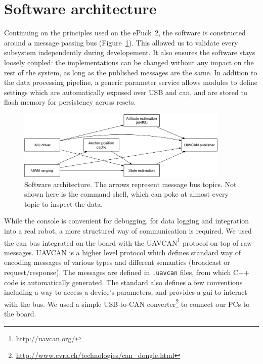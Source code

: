 \documentclass[a4paper, 12pt]{scrreprt}
\begin{document}
\section{Software architecture}

Continuing on the principles used on the ePuck~2, the software is constructed around a message passing bus (Figure~\ref{fig:architecture}).
This allowed us to validate every subsystem independently during developement.
It also ensures the software stays loosely coupled: the implementations can be changed without any impact on the rest of the system, as long as the published messages are the same.
In addition to the data processing pipeline, a generic parameter service allows modules to define settings which are automatically exposed over USB and \gls{can}, and are stored to flash memory for persistency across resets.

\begin{figure}[h]
    \centering
    \includegraphics[width=0.9\textwidth]{figures/architecture.pdf}
    \caption{Software architecture.
    The arrows represent message bus topics.
    Not shown here is the command shell, which can poke at almost every topic to inspect the data.
    }
    \label{fig:architecture}
\end{figure}

While the console is convenient for debugging, for data logging and integration into a real robot, a more structured way of communication is required.
We used the \gls{can} bus integrated on the board with the UAVCAN\footnote{\url{http://uavcan.org/}} protocol on top of raw messages.
UAVCAN is a higher level protocol which defines standard way of encoding messages of various types and different semantics (broadcast or request/response).
The messages are defined in \texttt{.uavcan} files, from which C++ code is automatically generated.
The standard also defines a few conventions including a way to access a device's parameters, and provides a \gls{gui} to interact with the bus.
We used a simple USB-to-CAN converter\footnote{\url{http://www.cvra.ch/technologies/can_dongle.html}} to connect our PCs to the board.
\end{document}
